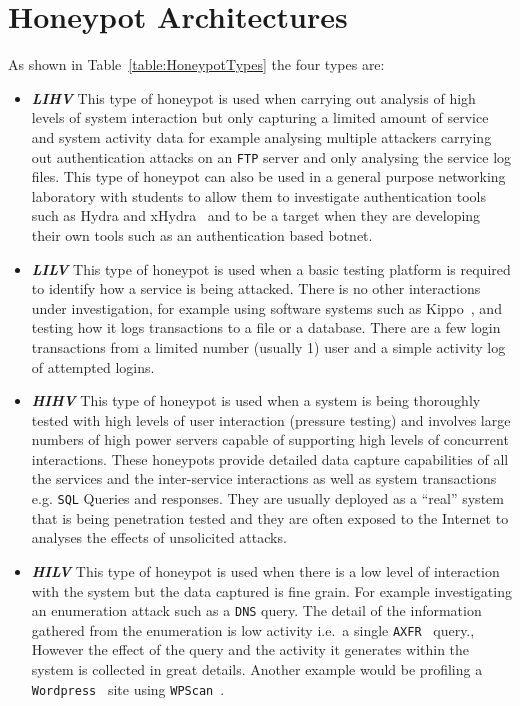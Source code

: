 \documentclass{llncs}
\begin{document}
\section{Honeypot Architectures}

As shown in Table~\ref{table:HoneypotTypes} the four types are:

\begin{itemize}
  \item \noindent \emph{\textbf{LIHV}} This type of honeypot is used when
    carrying out analysis of high levels of system interaction but only
    capturing a limited amount of service and system activity data for example
    analysing multiple attackers carrying out authentication attacks on an
    \texttt{FTP} server and only analysing the service log files. This type of
    honeypot can also be used in a general purpose networking laboratory with
    students to allow them to investigate authentication tools such as Hydra
    and xHydra~\cite{RS:15} and to be a target when they are developing their
    own tools such as an authentication based botnet.
  \item \noindent \emph{\textbf{LILV}} This type of honeypot is used when a
    basic testing platform is required to identify how a service is being
    attacked. There is no other interactions under investigation, for example
    using software systems such as Kippo~\cite{D:16,SH:15}, and testing how it
    logs transactions to a file or a database. There are a few login
    transactions from a limited number (usually 1) user and a simple activity
    log of attempted logins.
  \item \noindent \emph{\textbf{HIHV}} This type of honeypot is used when a
    system is being thoroughly tested with high levels of user interaction
    (pressure testing) and involves large numbers of high power servers capable
    of supporting high levels of concurrent interactions. These honeypots
    provide detailed data capture capabilities of all the services and the
    inter-service interactions as well as system transactions e.g. \texttt{SQL}
    Queries and responses. They are usually deployed as a ``real'' system that
    is being penetration tested and they are often exposed to the Internet to
    analyses the effects of unsolicited attacks.
  \item \noindent \emph{\textbf{HILV}} This type of honeypot is used when there
    is a low level of interaction with the system but the data captured is fine
    grain. For example investigating an enumeration attack such as a
    \texttt{DNS} query. The detail of the information gathered from the
    enumeration is low activity i.e.\ a single \texttt{AXFR}~\cite{EL:10}
    query., However the effect of the query and the activity it generates
    within the system is collected in great details. Another example would be
    profiling a \texttt{Wordpress}~\cite{WP:17} site using
    \texttt{WPScan}~\cite{WT:17}.
\end{itemize}
\end{document}
